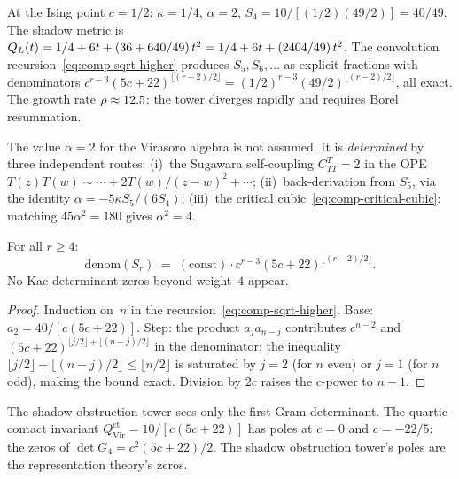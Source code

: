 \begin{example}[Virasoro at $c = 1/2$]
\label{ex:comp-virasoro-half}
At the Ising point $c = 1/2$: $\kappa = 1/4$, $\alpha = 2$,
$S_4 = 10/[(1/2)(49/2)] = 40/49$. The shadow metric is
$Q_L(t) = 1/4 + 6t + (36 + 640/49)\,t^2
= 1/4 + 6t + (2404/49)\,t^2$. The convolution
recursion~\eqref{eq:comp-sqrt-higher} produces $S_5, S_6, \ldots$
as explicit fractions with denominators $c^{r-3}(5c+22)^{\lfloor(r-2)/2\rfloor}
= (1/2)^{r-3}(49/2)^{\lfloor(r-2)/2\rfloor}$, all exact. The
growth rate $\rho \approx 12.5$: the tower diverges
rapidly and requires Borel resummation.
\end{example}

\begin{remark}[The cubic shadow $\alpha = 2$ is determined]
\label{rem:comp-alpha-determined}
The value $\alpha = 2$ for the Virasoro algebra is not assumed.
It is \emph{determined} by three independent routes: (i)~the
Sugawara self-coupling $C_{TT}^T = 2$ in the OPE
$T(z)T(w) \sim \cdots + 2T(w)/(z-w)^2 + \cdots$;
(ii)~back-derivation from $S_5$, via the identity
$\alpha = -5\kappa S_5/(6S_4)$;
(iii)~the critical cubic~\eqref{eq:comp-critical-cubic}:
matching $45\alpha^2 = 180$ gives $\alpha^2 = 4$.
\end{remark}

\begin{theorem}
\label{thm:comp-denom-pattern}
\ClaimStatusProvedHere
For all $r \geq 4$:
\[
 \mathrm{denom}(S_r)
 \;=\; (\mathrm{const}) \cdot
 c^{r-3}(5c+22)^{\lfloor(r-2)/2\rfloor}.
\]
No Kac determinant zeros beyond weight~$4$ appear.
\end{theorem}

\begin{proof}
Induction on~$n$ in the recursion~\eqref{eq:comp-sqrt-higher}.
Base: $a_2 = 40/[c(5c{+}22)]$. Step: the product
$a_j a_{n-j}$ contributes $c^{n-2}$ and
$(5c{+}22)^{\lfloor j/2\rfloor + \lfloor(n-j)/2\rfloor}$
in the denominator; the inequality
$\lfloor j/2\rfloor + \lfloor(n{-}j)/2\rfloor
\leq \lfloor n/2\rfloor$ is saturated by $j = 2$ (for $n$ even)
or $j = 1$ (for $n$ odd), making the bound exact.
Division by $2c$ raises the $c$-power to $n - 1$.
\end{proof}

The shadow obstruction tower sees only the first Gram determinant. The
quartic contact invariant $Q^{\mathrm{ct}}_{\mathrm{Vir}}
= 10/[c(5c+22)]$ has poles at $c = 0$ and $c = -22/5$: the
zeros of $\det G_4 = c^2(5c+22)/2$. The shadow obstruction tower's poles
are the representation theory's zeros.


